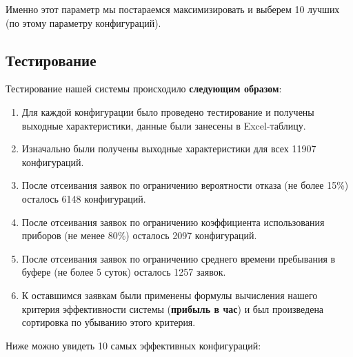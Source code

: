 \documentclass[a4paper, 14pt]{article}
\begin{document}
Именно этот параметр мы постараемся максимизировать и выберем 10 лучших (по этому параметру конфигураций).

\subsection{Тестирование}

Тестирование нашей системы происходило \textbf{следующим образом}:

\begin{enumerate}
	\item Для каждой конфигурации было проведено тестирование и получены выходные характеристики, данные были занесены в Excel-таблицу.
	\item Изначально были получены выходные характеристики для всех 11907 конфигураций.
	\item После отсеивания заявок по ограничению вероятности отказа (не более 15\%) осталось 6148 конфигураций.
	\item После отсеивания заявок по ограничению коэффициента использования приборов (не менее 80\%) осталось 2097 конфигураций.
	\item После отсеивания заявок по ограничению среднего времени пребывания в буфере (не более 5 суток) осталось 1257 заявок.
	\item К оставшимся заявкам были применены формулы вычисления нашего критерия эффективности системы (\textbf{прибыль в час}) и был произведена сортировка по убыванию этого критерия.
\end{enumerate}

Ниже можно увидеть 10 самых эффективных конфигураций:
\end{document}
